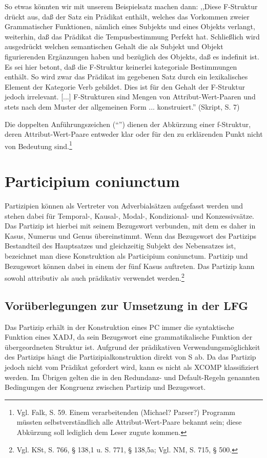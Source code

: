 \documentclass[12pt,a4paper]{article}
\begin{document}
So etwas könnten wir mit unserem Beispielsatz machen dann: 
,,Diese F-Struktur drückt aus, daß der Satz ein Prädikat enthält, welches das Vorkommen zweier Grammatischer Funktionen, nämlich eines Subjekts und eines Objekts verlangt, weiterhin, daß das Prädikat die Tempusbestimmung Perfekt hat. Schließlich wird ausgedrückt welchen semantischen Gehalt die als Subjekt und Objekt figurierenden Ergänzungen haben und bezüglich des Objekts, daß es indefinit ist. Es sei hier betont, daß die F-Struktur keinerlei kategoriale Bestimmungen enthält. So wird zwar das Prädikat im gegebenen Satz durch ein lexikalisches Element der Kategorie Verb gebildet. Dies ist für den Gehalt der F-Struktur jedoch irrelevant. [...] F-Strukturen sind Mengen von Attribut-Wert-Paaren und stets nach dem Muster der allgemeinen Form ... konstruiert.'' (Skript, S. 7)

Die doppelten Anführungszeichen (``'') dienen der Abkürzung einer f-Struktur, deren Attribut-Wert-Paare entweder klar oder für den zu erklärenden Punkt nicht von Bedeutung sind.\footnote{Vgl. Falk, S. 59. Einem verarbeitenden (Michael? Parser?) Programm müssten selbstverständlich alle Attribut-Wert-Paare bekannt sein; diese Abkürzung soll lediglich dem Leser zugute kommen.}

\section{Participium coniunctum}
Partizipien können als Vertreter von Adverbialsätzen aufgefasst werden und stehen dabei für Temporal-, Kausal-, Modal-, Kondizional- und Konzessivsätze. Das Partizip ist hierbei mit seinem Bezugswort verbunden, mit dem es daher in Kasus, Numerus und Genus übereinstimmt. Wenn das Bezugswort des Partizips Bestandteil des Hauptsatzes und gleichzeitig Subjekt des Nebensatzes ist, bezeichnet man diese Konstruktion als Participium coniunctum. Partizip und Bezugswort können dabei in einem der fünf Kasus  auftreten. Das Partizip kann sowohl attributiv als auch prädikativ verwendet werden.\footnote{Vgl. KSt, S. 766, § 138,1 u. S. 771, § 138,5a; Vgl. NM, S. 715, § 500.} \\

\subsection{Vorüberlegungen zur Umsetzung in der LFG}
Das Partizip erhält in der Konstruktion eines PC immer die syntaktische Funktion eines XADJ, da sein Bezugswort eine grammatikalische Funktion der übergeordneten Struktur ist. Aufgrund der prädikativen Verwendungsmöglichkeit des Partizips hängt die Partizipialkonstruktion direkt von S ab. Da das Partizip jedoch nicht vom Prädikat gefordert wird, kann es nicht als XCOMP klassifiziert werden.
Im Übrigen gelten die in den Redundanz- und Default-Regeln genannten Bedingungen der Kongruenz zwischen Partizip und Bezugswort.
\end{document}
